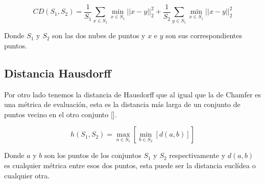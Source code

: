 \begin{equation}
	\label{eq:6}
	CD(S_{1}, S_{2}) = 
	\frac{1}{S_{1}} \sum_{x \in S_{1}}{} \min_{x \in S_1}|| x - y ||_{2}^{2} +
	\frac{1}{S_{2}} \sum_{y \in S_{1}}{} \min_{x \in S_1}|| x - y ||_{2}^{2}
\end{equation}

Donde $S_{1}$ y $S_{2}$ son las dos nubes de puntos y $x$ e $y$ son sus correspondientes puntos.

\subsection{Distancia Hausdorff}
Por otro lado tenemos la distancia de Hausdorff que al igual que la de Chamfer es una métrica de evaluación, esta es la distancia más larga de un conjunto de puntos vecino en el otro conjunto [\cite{grégoire_bouillot_2022}].

\begin{equation}
	\label{eq:7}
	h(S_{1}, S_{2}) = 
	\max_{a \in S_{1}} [ \min_{b \in S_{2}} [d(a,b)]]
\end{equation}

Donde $a$ y $b$ son los puntos de los conjuntos $S_{1}$ y $S_{2}$ respectivamente y $d(a,b)$ es cualquier métrica entre esos dos puntos, esta puede ser la distancia euclídea o cualquier otra.

